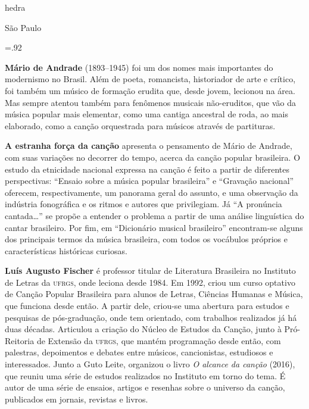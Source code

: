               \newfontfamily{}
              {\fontsize{30}{40}\selectfont \timesnewroman hedra}
              
              \medskip

              {\selectfont\minion\small
              São Paulo \quad\the\year}
\endgroup
\pagebreak

\begingroup 

\footnotesize\parindent0pt\parskip5pt\thispagestyle{empty} 
\vspace*{.1\textheight}\mbox{} \vfill
\baselineskip=.92\baselineskip
\thispagestyle{empty}

\textbf{Mário de Andrade} (1893--1945) foi um dos nomes mais importantes do modernismo no Brasil. Além de poeta, romancista, historiador de arte e crítico, foi também um músico de formação erudita que, desde jovem, lecionou na área. Mas sempre atentou também para fenômenos musicais não-eruditos, que vão da música popular mais elementar, como uma cantiga ancestral de roda, ao mais elaborado, como a canção orquestrada para músicos através de partituras.

\textbf{A estranha força da canção} apresenta o pensamento de Mário de Andrade, com suas variações no decorrer do tempo, acerca da canção popular brasileira. O estudo da etnicidade nacional expressa na canção é feito a partir de diferentes perspectivas: ``Ensaio sobre a música popular brasileira'' e ``Gravação nacional'' oferecem, respectivamente, um panorama geral do assunto, e uma observação da indústria fonográfica e os
ritmos e autores que privilegiam. Já ``A pronúncia cantada\ldots'' se propõe a entender o problema a partir de uma análise linguística do cantar brasileiro. Por fim, em ``Dicionário musical brasileiro'' encontram-se alguns dos principais termos da música brasileira, com todos os vocábulos próprios e características históricas curiosas.

\textbf{Luís Augusto Fischer} é professor titular de Literatura Brasileira no Instituto de Letras da \textsc{ufrgs}, onde leciona desde 1984. Em 1992, criou um curso optativo de Canção Popular Brasileira para alunos de Letras, Ciências Humanas e Música, que funciona desde então. A partir dele, criou-se uma abertura para estudos e pesquisas de pós-graduação, onde tem orientado, com trabalhos realizados já há duas décadas. Articulou a criação do Núcleo de Estudos da Canção, junto à Pró-Reitoria de Extensão da \textsc{ufrgs}, que mantém programação desde então, com palestras, depoimentos e debates entre músicos, cancionistas, estudiosos e interessados. Junto a Guto Leite, organizou o livro \textit{O alcance da canção} (2016), que reuniu uma série de estudos realizados no Instituto em torno do tema. É autor de uma série de ensaios, artigos e resenhas sobre o universo da canção, publicados em jornais, revistas e livros.

\endgroup
\pagebreak
